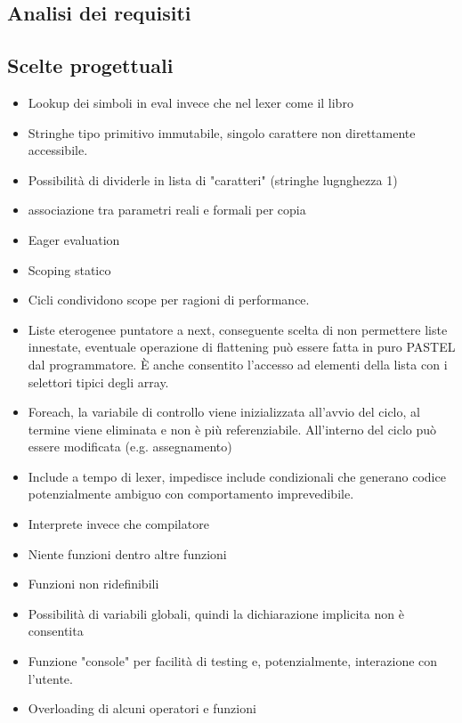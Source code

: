 \documentclass[10pt]{article}
\begin{document}
\subsection{Analisi dei requisiti}

\subsection{Scelte progettuali}

\begin{itemize}
	\item Lookup dei simboli in eval invece che nel lexer come il libro~\cite{levine2009flex}
	\item Stringhe tipo primitivo immutabile, singolo carattere non direttamente accessibile. 
	\item Possibilità di dividerle in lista di "caratteri" (stringhe lugnghezza 1)
	\item associazione tra parametri reali e formali per copia
	\item Eager evaluation
	\item Scoping statico
	\item Cicli condividono scope per ragioni di performance.
	\item Liste eterogenee puntatore a next, conseguente scelta di non permettere liste innestate, eventuale operazione di flattening può essere fatta in puro PASTEL dal programmatore. È anche consentito l'accesso ad elementi della lista con i selettori tipici degli array.
	\item Foreach, la variabile di controllo viene inizializzata all'avvio del ciclo, al termine viene eliminata e non è più referenziabile.
	All'interno del ciclo può essere modificata (e.g. assegnamento)
	\item Include a tempo di lexer, impedisce include condizionali che generano codice potenzialmente ambiguo con comportamento imprevedibile.
	\item Interprete invece che compilatore
	\item Niente funzioni dentro altre funzioni
	\item Funzioni non ridefinibili 
	\item Possibilità di variabili globali, quindi la dichiarazione implicita non è consentita
	\item Funzione "console" per facilità di testing e, potenzialmente, interazione con l'utente.
	\item Overloading di alcuni operatori e funzioni 

\end{itemize}
\end{document}
